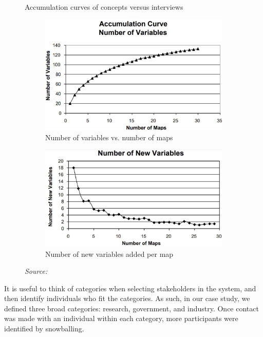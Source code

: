 \begin{figure}[ht]
\caption{Accumulation curves of concepts versus interviews} \label{accumFCM}
\begin{subfigure}[b]{0.45\textwidth}
  \centering
  \includegraphics[width=\textwidth]{fig/numVars.jpg}
\caption{Number of variables vs. number of maps} 
  \label{accumFCM:sub1}
\end{subfigure}%
  \hfill
\begin{subfigure}[b]{0.45\textwidth}
  \centering
  \includegraphics[width=\textwidth]{fig/newVars.jpg}
\caption{Number of new variables added per map}    
  \label{accumFCM:sub2}
\end{subfigure}
\caption*{\textit{Source:} \cite{ozesmi2004ecological}}
\end{figure}

It is useful to think of categories when selecting stakeholders in the system, and then identify individuals who fit the categories. As such, in our case study, we defined three broad categories: research, government, and industry. Once contact was made with an individual within each category, more participants were identified by snowballing. 


